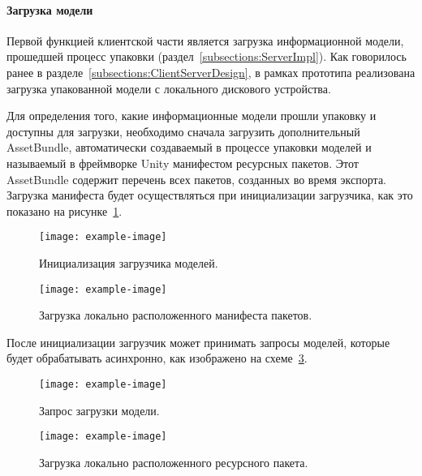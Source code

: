 ﻿\paragraph{Загрузка модели}

Первой функцией клиентской части является загрузка информационной модели,
прошедшей процесс упаковки (раздел~\ref{subsections:ServerImpl}).
Как говорилось ранее в разделе~\ref{subsections:ClientServerDesign},
в рамках прототипа реализована загрузка упакованной модели
с локального дискового устройства.

Для определения того, какие информационные модели прошли упаковку
и доступны для загрузки, необходимо сначала загрузить дополнительный AssetBundle,
автоматически создаваемый в процессе упаковки моделей
и называемый в фреймворке Unity манифестом ресурсных пакетов.
Этот AssetBundle содержит перечень всех пакетов, созданных во время экспорта.%
\cite{DocUnity,UnityAssetsResourcesBundles}
Загрузка манифеста будет осуществляться при инициализации загрузчика,
как это показано на рисунке~\ref{figure:SInitModelLoader}.

\begin{figure}[!htp]
    \centering
    \texttt{[image: example-image]}
    \caption{Инициализация загрузчика моделей.}
    \label{figure:SInitModelLoader}
\end{figure}


\begin{figure}[!htp]
    \centering
    \texttt{[image: example-image]}
    \caption{Загрузка локально расположенного манифеста пакетов.}
    \label{figure:SLocalLoadManifestBundle}
\end{figure}

После инициализации загрузчик может принимать запросы моделей,
которые будет обрабатывать асинхронно, как изображено
на схеме~\ref{figure:SModelRequest}.

\begin{figure}[!htp]
    \centering
    \texttt{[image: example-image]}
    \caption{Запрос загрузки модели.}
    \label{figure:SModelRequest}
\end{figure}


\begin{figure}[!htp]
    \centering
    \texttt{[image: example-image]}
    \caption{Загрузка локально расположенного ресурсного пакета.}
    \label{figure:SLocalLoadBundle}
\end{figure}
